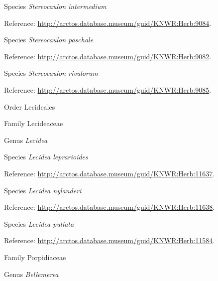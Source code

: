 \documentclass[9pt, article]{memoir}
\begin{document}
\begin{multicols}{2}
\vspace{6pt}\noindent\hspace{36pt}Species \textit{Stereocaulon intermedium}


Reference: 
\url{http://arctos.database.museum/guid/KNWR:Herb:9084}.

\vspace{6pt}\noindent\hspace{36pt}Species \textit{Stereocaulon paschale}


Reference: 
\url{http://arctos.database.museum/guid/KNWR:Herb:9082}.

\vspace{6pt}\noindent\hspace{36pt}Species \textit{Stereocaulon rivulorum}


Reference: 
\url{http://arctos.database.museum/guid/KNWR:Herb:9085}.

\vspace{6pt}\noindent\hspace{18pt}Order Lecideales


\vspace{6pt}\noindent\hspace{24pt}Family Lecideaceae


\vspace{6pt}\noindent\hspace{30pt}Genus \textit{Lecidea}


\vspace{6pt}\noindent\hspace{36pt}Species \textit{Lecidea leprarioides}


Reference: 
\url{http://arctos.database.museum/guid/KNWR:Herb:11637}.

\vspace{6pt}\noindent\hspace{36pt}Species \textit{Lecidea nylanderi}


Reference: 
\url{http://arctos.database.museum/guid/KNWR:Herb:11638}.

\vspace{6pt}\noindent\hspace{36pt}Species \textit{Lecidea pullata}


Reference: 
\url{http://arctos.database.museum/guid/KNWR:Herb:11584}.

\vspace{6pt}\noindent\hspace{24pt}Family Porpidiaceae


\vspace{6pt}\noindent\hspace{30pt}Genus \textit{Bellemerea}



\end{multicols}
\end{document}
